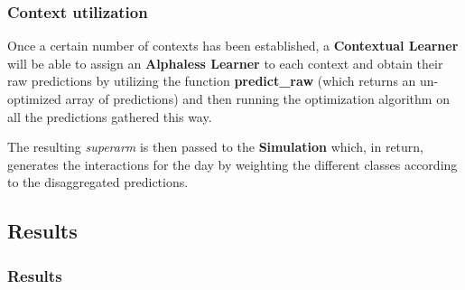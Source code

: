 \documentclass[11pt]{beamer}
\begin{document}

\begin{frame}

\frametitle{Context utilization}

Once a certain number of contexts has been established, a \textbf{Contextual Learner} will be able to assign an \textbf{Alphaless Learner} to each context and obtain their raw predictions by utilizing the function \textbf{predict\_raw} (which returns an un-optimized array of predictions) and then running the optimization algorithm on all the predictions gathered this way.

The resulting \textit{superarm} is then passed to the \textbf{Simulation} which, in return, generates the interactions for the day by weighting the different classes according to the disaggregated predictions.

\end{frame}


\subsection{Results}


\begin{frame}

\frametitle{Results}
\framesubtitle{}


\end{frame}

\end{document}
